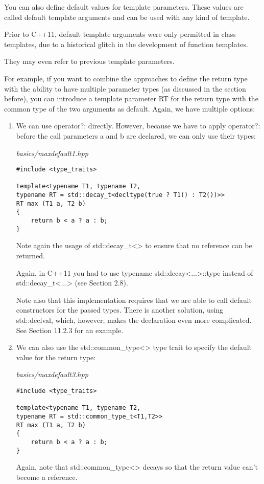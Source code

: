 You can also define default values for template parameters. These values are called default template arguments and can be used with any kind of template.

\begin{tcolorbox}[colback=webgreen!5!white,colframe=webgreen!75!black]
\hspace*{0.75cm}Prior to C++11, default template arguments were only permitted in class templates, due to a historical glitch in the development of function templates.
\end{tcolorbox}

They may even refer to previous template parameters.

For example, if you want to combine the approaches to define the return type with the ability to have multiple parameter types (as discussed in the section before), you can introduce a template parameter RT for the return type with the common type of the two arguments as default. Again, we have multiple options:


\begin{enumerate}
\item 
We can use operator?: directly. However, because we have to apply operator?: before the call parameters a and b are declared, we can only use their types:

\noindent
\textit{basics/maxdefault1.hpp}
\begin{lstlisting}[style=styleCXX]
#include <type_traits>

template<typename T1, typename T2,
typename RT = std::decay_t<decltype(true ? T1() : T2())>>
RT max (T1 a, T2 b)
{
	return b < a ? a : b;
}
\end{lstlisting}

Note again the usage of std::decay\_t<> to ensure that no reference can be returned.

\begin{tcolorbox}[colback=webgreen!5!white,colframe=webgreen!75!black]
\hspace*{0.75cm}Again, in C++11 you had to use typename std::decay<...>::type instead of std::decay\_t<...> (see Section 2.8).
\end{tcolorbox}

Note also that this implementation requires that we are able to call default constructors for the passed types. There is another solution, using std::declval, which, however, makes the declaration even more complicated. See Section 11.2.3 for an example.

\item
We can also use the std::common\_type<> type trait to specify the default value for the return type: 

\noindent
\textit{basics/maxdefault3.hpp}
\begin{lstlisting}[style=styleCXX]
#include <type_traits>

template<typename T1, typename T2,
typename RT = std::common_type_t<T1,T2>>
RT max (T1 a, T2 b)
{
	return b < a ? a : b;
}
\end{lstlisting}

Again, note that std::common\_type<> decays so that the return value can’t become a reference.
\end{enumerate}

